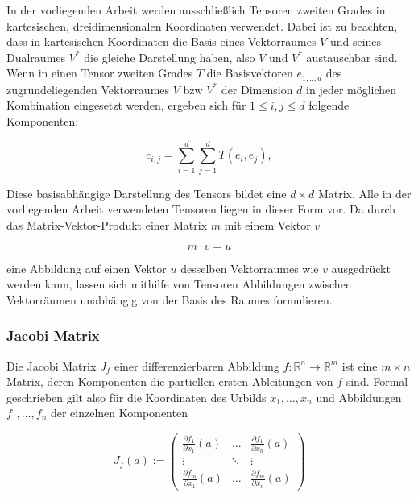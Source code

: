 \documentclass[a4paper,fontsize=12pt,toc=bib,halfparskip]{scrartcl}
\begin{document}
In der vorliegenden Arbeit werden ausschlie{\ss}lich Tensoren zweiten Grades in kartesischen, dreidimensionalen Koordinaten verwendet. Dabei ist zu beachten, dass in kartesischen Koordinaten die Basis eines Vektorraumes $V$ und seines Dualraumes $V^*$ die gleiche Darstellung haben, also $V$ und $V^*$ austauschbar sind. Wenn in einen Tensor zweiten Grades $T$ die Basisvektoren $e_{1,..,d}$ des zugrundeliegenden Vektorraumes $V$ bzw $V^*$ der Dimension $d$ in jeder m\"oglichen Kombination eingesetzt werden, ergeben sich f\"ur $1\leq i,j\leq d$ folgende Komponenten:

\begin{equation}
	c_{i,j} = \sum_{i=1}^{d} \sum_{j=1}^{d} T(e_i, e_j),  
\end{equation}

Diese basisabh\"angige Darstellung des Tensors bildet eine $d\times d$ Matrix. Alle in der vorliegenden Arbeit verwendeten Tensoren liegen in dieser Form vor. Da durch das Matrix-Vektor-Produkt einer Matrix $m$ mit einem Vektor $v$

\begin{equation}
	m \cdot v = u
\end{equation} 

eine Abbildung auf einen Vektor $u$ desselben Vektorraumes wie $v$ ausgedr\"uckt werden kann, lassen sich mithilfe von Tensoren Abbildungen zwischen Vektorr\"aumen unabh\"angig von der Basis des Raumes formulieren.

\subsubsection{Jacobi Matrix}
Die Jacobi Matrix $J_f$ einer differenzierbaren Abbildung $f: \mathbb{R}^n \rightarrow \mathbb{R}^m$ ist eine $m \times n$ Matrix, deren Komponenten die partiellen ersten Ableitungen von $f$ sind. Formal geschrieben gilt also f\"ur die Koordinaten des Urbilds $x_1, \dots, x_n$ und Abbildungen $f_1, ..., f_n$ der einzelnen Komponenten

\begin{equation}
J_f(a) := 
\begin{pmatrix}
\frac{\partial f_1}{\partial x_1}(a) & \dots & \frac{\partial f_1}{\partial x_n}(a)  \\
\vdots & \ddots & \vdots \\
\frac{\partial f_m}{\partial x_1}(a) & \dots & \frac{\partial f_m}{\partial x_n}(a) 
\end{pmatrix}
\end{equation}
\end{document}

